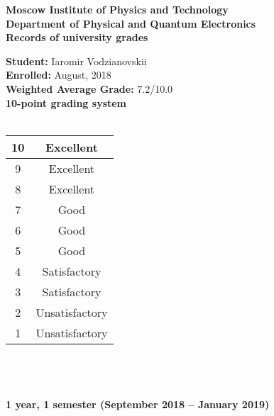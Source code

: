 \documentclass[a4paper]{article}
\title{}
\author{}
\date{}
\begin{document}
\begin{center}
\textbf{Moscow Institute of Physics and Technology \\Department of Physical and Quantum Electronics\\Records of university grades}
\end{center}
\textbf{Student:} Iaromir Vodzianovskii\\
\textbf{Enrolled:} August, 2018\\
\textbf{Weighted Average Grade:} 7.2/10.0\\

\textbf{10-point grading system}\\ \\
\begin{tabular}{|c|c|}
\hline
10&Excellent\\
\hline
9&Excellent\\
\hline
8&Excellent\\
\hline
7&Good\\
\hline
6&Good\\
\hline
5&Good\\
\hline
4&Satisfactory\\
\hline
3&Satisfactory\\
\hline
2&Unsatisfactory\\
\hline
1&Unsatisfactory\\
\hline
\end{tabular}
\\ \\
\\
\textbf{1 year, 1 semester (September 2018 -- January 2019)}\\ \\
\end{document}
